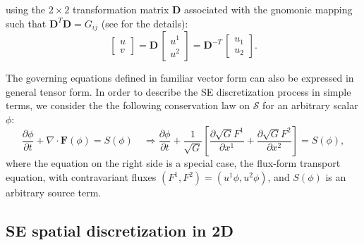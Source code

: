 \documentclass{agujournal}
\begin{document}
{ using the  $2 \times 2$ transformation matrix  $\mathbf{D}$ associated with the gnomonic mapping 
 such that   $\mathbf{D}^T\mathbf{D} = G_{ij}$ (see \cite{NTL2005MWR} for the details):  
    \begin{equation}
     \left[   \begin{array}{c}
               u \\ v
             \end{array}
           \right]
           =
     \mathbf{D}  \, \left[   \begin{array}{c}
               u^1 \\ u^2
             \end{array}
           \right] =
            \mathbf{D}^{-T}  \, \left[   \begin{array}{c}
               u_1 \\ u_2
             \end{array}
           \right]. 
          \label{eq:covcontra} 
\end{equation}

 The governing equations defined in familiar vector form can also be expressed 
 in  general tensor form. In order  to  describe the SE discretization process in simple terms, we consider the 
 the following conservation law  on $\mathcal{S}$ for an arbitrary  scalar $\phi$:  
 \begin{equation}
 \frac{\partial \phi }{\partial t}  + \nabla \cdot \mathbf{F}(\phi)  = S(\phi)   \quad   
 \Rightarrow   %
   \frac{\partial \phi }{\partial t}  + \frac{1}{\sqrt{G}} \left[   \frac{\partial  \sqrt{G} F^1}{\partial x^1}  + 
   \frac{\partial  \sqrt{G} F^2}{\partial x^2}      \right]   = S(\phi),  
  \label{eq:se1} 
   \end{equation} 
  where the equation on the right side is a special case, the flux-form transport equation, with 
   contravariant fluxes $(F^1, F^2) = (u^1 \phi , u^2 \phi)$, and $S(\phi)$  is an arbitrary source term.

  
\subsection{\normalsize SE spatial discretization in 2D}

}
\end{document}
